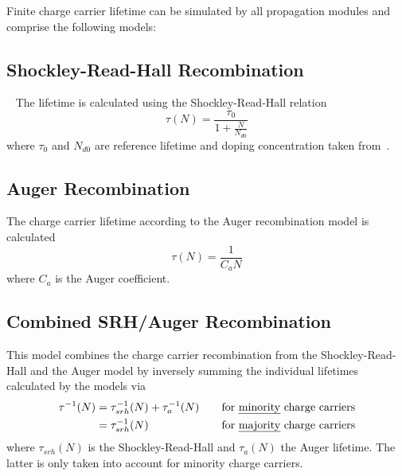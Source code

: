 Finite charge carrier lifetime can be simulated by all propagation modules and comprise the following models:

\subsection{Shockley-Read-Hall Recombination}

~\cite{shockley-read,hall}
The lifetime is calculated using the Shockley-Read-Hall relation~\cite{fossum-lee}
\begin{equation}
    \tau(N) = \frac{\tau_0}{1 + \frac{N}{N_{d0}}}
\end{equation}
where $\tau_0$ and $N_{d0}$ are reference lifetime and doping concentration taken from~\cite{fossum}.

\subsection{Auger Recombination}

The charge carrier lifetime according to the Auger recombination model is calculated~\cite{haug}
\begin{equation}
    \tau(N) = \frac{1}{C_{a}N}
\end{equation}
where $C_{a}$ is the Auger coefficient.

\subsection{Combined SRH/Auger Recombination}

This model combines the charge carrier recombination from the Shockley-Read-Hall and the Auger model by inversely summing the individual lifetimes calculated by the models via
\begin{align}
    \label{eq:recom:combined}
    \tau^{-1}(N) &= \tau_{srh}^{-1}(N) + \tau_{a}^{-1}(N) &\quad \textrm{for \emph{minority} charge carriers} \nonumber \\
              &= \tau_{srh}^{-1}(N) &\quad \textrm{for \emph{majority} charge carriers}
\end{align}
where $\tau_{srh}(N)$ is the Shockley-Read-Hall and $\tau_{a}(N)$ the Auger lifetime.
The latter is only taken into account for minority charge carriers.
